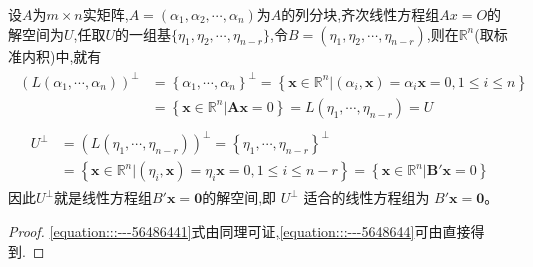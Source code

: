 \documentclass[../../main.tex]{subfiles}%
\begin{document}
\begin{corollary}\label{corollary:齐次方程的解空间是其系数矩阵的正交补空间}
设$A$为$m\times n$实矩阵,$A=(\alpha_1,\alpha_2,\cdots,\alpha_n)$为$A$的列分块,齐次线性方程组$Ax=O$的解空间为$U$,任取$U$的一组基$\{\eta_1,\eta_2,\cdots,\eta_{n-r}\}$,令$B=(\eta_1,\eta_2,\cdots,\eta_{n-r})$,则在$\mathbb{R}^n$(取标准内积)中,就有
\begin{align}\label{equation:::---56486441}
\begin{aligned}
\left( L\left( \alpha _1,\cdots ,\alpha _n \right) \right) ^{\bot}&=\left\{ \alpha _1,\cdots ,\alpha _n \right\} ^{\bot}=\left\{ \boldsymbol{x}\in \mathbb{R} ^n|\left( \alpha _i,\boldsymbol{x} \right) =\alpha _i\boldsymbol{x}=0,1\leqslant i\leqslant n \right\} 
\\
&=\left\{ \boldsymbol{x}\in \mathbb{R} ^n|\boldsymbol{Ax}=0 \right\} =L\left( \eta _1,\cdots ,\eta _{n-r} \right) =U
\end{aligned}
\end{align}
\begin{align}\label{equation:::---5648644}
\begin{aligned}
U^{\bot}&=\left( L\left( \eta _1,\cdots ,\eta _{n-r} \right) \right) ^{\bot}=\left\{ \eta _1,\cdots ,\eta _{n-r} \right\} ^{\bot}
\\
&=\left\{ \boldsymbol{x}\in \mathbb{R} ^n|\left( \eta _i,\boldsymbol{x} \right) =\eta _i\boldsymbol{x}=0,1\leqslant i\leqslant n-r \right\} =\left\{ \boldsymbol{x}\in \mathbb{R} ^n|\boldsymbol{B}'\boldsymbol{x}=0 \right\} 
\end{aligned}
\end{align}
因此$U^{\perp}$就是线性方程组$B'\boldsymbol{x} = \boldsymbol{0}$的解空间,即 $U^{\perp}$ 适合的线性方程组为 $B'\boldsymbol{x} = \boldsymbol{0}$。
\end{corollary}
\begin{proof}

\eqref{equation:::---56486441}式由同理可证,\eqref{equation:::---5648644}可由直接得到.

\end{proof}
\end{document}
